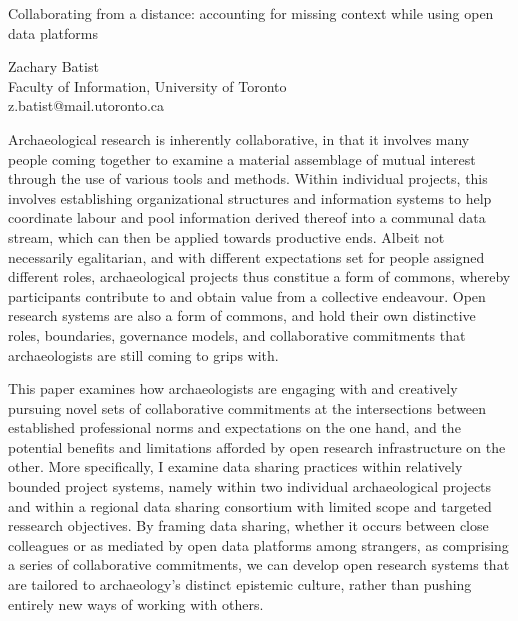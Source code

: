 \documentclass[a4paper]{article}
\begin{document}

\large
\begin{center}
Collaborating from a distance: accounting for missing context while using open data platforms

\large
Zachary Batist\\

\small  
Faculty of Information, University of Toronto\\
z.batist@mail.utoronto.ca\\

\end{center}

\normalsize

Archaeological research is inherently collaborative, in that it involves many people coming together to examine a material assemblage of mutual interest through the use of various tools and methods. Within individual projects, this involves establishing organizational structures and information systems to help coordinate labour and pool information derived thereof into a communal data stream, which can then be applied towards productive ends. Albeit not necessarily egalitarian, and with different expectations set for people assigned different roles, archaeological projects thus constitue a form of commons, whereby participants contribute to and obtain value from a collective endeavour. Open research systems are also a form of commons, and hold their own distinctive roles, boundaries, governance models, and collaborative commitments that archaeologists are still coming to grips with.

This paper examines how archaeologists are engaging with and creatively pursuing novel sets of collaborative commitments at the intersections between established professional norms and expectations on the one hand, and the potential benefits and limitations afforded by open research infrastructure on the other. More specifically, I examine data sharing practices within relatively bounded project systems, namely within two individual archaeological projects and within a regional data sharing consortium with limited scope and targeted ressearch objectives. By framing data sharing, whether it occurs between close colleagues or as mediated by open data platforms among strangers, as comprising a series of collaborative commitments, we can develop open research systems that are tailored to archaeology's distinct epistemic culture, rather than pushing entirely new ways of working with others.
\end{document}
